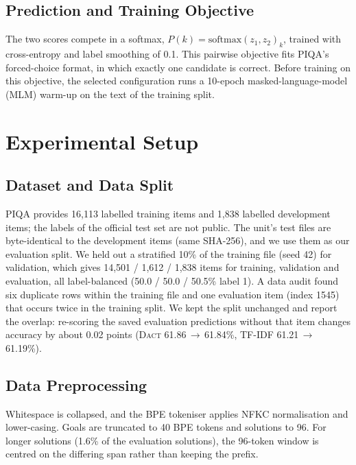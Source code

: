 \documentclass[11pt]{article}
\newcommand{\dact}{\textsc{Dact}}
\begin{document}
\subsection{Prediction and Training Objective}
The two scores compete in a softmax, $P(k) = \mathrm{softmax}(z_1, z_2)_k$, trained with cross-entropy and label smoothing of 0.1. This pairwise objective fits PIQA's forced-choice format, in which exactly one candidate is correct. Before training on this objective, the selected configuration runs a 10-epoch masked-language-model (MLM) warm-up \cite{devlin2019bert} on the text of the training split.


\section{Experimental Setup}

\subsection{Dataset and Data Split}
PIQA provides 16{,}113 labelled training items and 1{,}838 labelled development items; the labels of the official test set are not public. The unit's test files are byte-identical to the development items (same SHA-256), and we use them as our evaluation split. We held out a stratified 10\% of the training file (seed 42) for validation, which gives 14{,}501 / 1{,}612 / 1{,}838 items for training, validation and evaluation, all label-balanced (50.0 / 50.0 / 50.5\% label 1). A data audit found six duplicate rows within the training file and one evaluation item (index 1545) that occurs twice in the training split. We kept the split unchanged and report the overlap: re-scoring the saved evaluation predictions without that item changes accuracy by about 0.02 points (\dact{} 61.86\,$\to$\,61.84\%, TF-IDF 61.21\,$\to$\,61.19\%).

\subsection{Data Preprocessing}
Whitespace is collapsed, and the BPE tokeniser applies NFKC normalisation and lower-casing. Goals are truncated to 40 BPE tokens and solutions to 96. For longer solutions (1.6\% of the evaluation solutions), the 96-token window is centred on the differing span rather than keeping the prefix.
\end{document}
